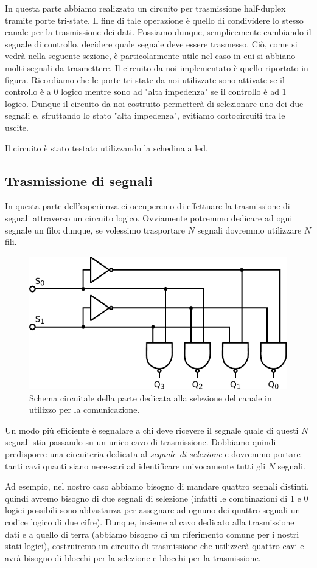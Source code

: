 In questa parte abbiamo realizzato un circuito per trasmissione half-duplex tramite porte tri-state.
Il fine di tale operazione è quello di condividere lo stesso canale per la trasmissione dei dati.
Possiamo dunque, semplicemente cambiando il segnale di controllo, decidere quale segnale deve essere trasmesso.
Ciò, come si vedrà nella seguente sezione, è particolarmente utile nel caso in cui si abbiano molti segnali da trasmettere.
Il circuito da noi implementato è quello riportato in figura.
Ricordiamo che le porte tri-state da noi utilizzate sono attivate se il controllo è a 0 logico mentre sono ad "alta impedenza" se il controllo è ad 1 logico.
Dunque il circuito da noi costruito permetterà di selezionare uno dei due segnali e, sfruttando lo stato "alta impedenza", evitiamo cortocircuiti tra le uscite.

Il circuito è stato testato utilizzando la schedina a led.

\subsection{Trasmissione di segnali}

In questa parte dell'esperienza ci occuperemo di effettuare la trasmissione di segnali attraverso un circuito logico.
Ovviamente potremmo dedicare ad ogni segnale un filo: dunque, se volessimo trasportare $N$ segnali dovremmo utilizzare $N$ fili.

\begin{figure}
\centering
\includegraphics[width=.38\textwidth]{../E10/latex/selector.pdf}
\caption{Schema circuitale della parte dedicata alla selezione del canale in utilizzo per la comunicazione.}
\label{cir10:selector}
\end{figure}

Un modo più efficiente è segnalare a chi deve ricevere il segnale quale di questi $N$ segnali stia passando su un unico cavo di trasmissione.
Dobbiamo quindi predisporre una circuiteria dedicata al \textit{segnale di selezione} e dovremmo portare tanti cavi quanti siano necessari ad identificare univocamente tutti gli $N$ segnali.

Ad esempio, nel nostro caso abbiamo bisogno di mandare quattro segnali distinti, quindi avremo bisogno di due segnali di selezione (infatti le combinazioni di 1 e 0 logici possibili sono abbastanza per assegnare ad ognuno dei quattro segnali un codice logico di due cifre).
Dunque, insieme al cavo dedicato alla trasmissione dati e a quello di terra (abbiamo bisogno di un riferimento comune per i nostri stati logici), costruiremo un circuito di trasmissione che utilizzerà quattro cavi e avrà bisogno di blocchi per la selezione e blocchi per la trasmissione.

